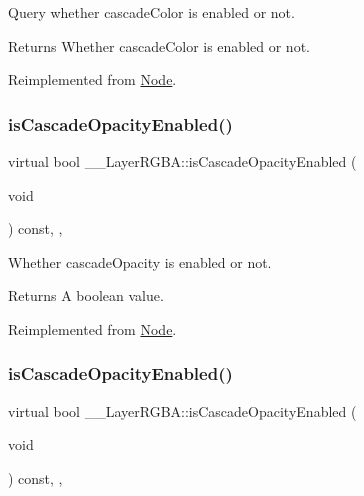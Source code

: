 Query whether cascade\+Color is enabled or not. \begin{DoxyReturn}{Returns}
Whether cascade\+Color is enabled or not. 
\end{DoxyReturn}


Reimplemented from \hyperlink{classNode_abf874f1b388e773ca80732b1134508be}{Node}.

\mbox{\label{class____LayerRGBA_a3dd348cf39ca267d7c0ebb5000dce45e}} 
\subsubsection{\texorpdfstring{is\+Cascade\+Opacity\+Enabled()}{isCascadeOpacityEnabled()}\hspace{0.1cm}{\footnotesize\ttfamily [1/2]}}
{\footnotesize\ttfamily virtual bool \+\_\+\+\_\+\+Layer\+R\+G\+B\+A\+::is\+Cascade\+Opacity\+Enabled (\begin{DoxyParamCaption}\item[{void}]{ }\end{DoxyParamCaption}) const\hspace{0.3cm}{\ttfamily [inline]}, {\ttfamily [override]}, {\ttfamily [virtual]}}

Whether cascade\+Opacity is enabled or not. \begin{DoxyReturn}{Returns}
A boolean value. 
\end{DoxyReturn}


Reimplemented from \hyperlink{classNode_a79f5da3b20b08356467db7ce95cf9f54}{Node}.

\mbox{\label{class____LayerRGBA_a3dd348cf39ca267d7c0ebb5000dce45e}} 
\subsubsection{\texorpdfstring{is\+Cascade\+Opacity\+Enabled()}{isCascadeOpacityEnabled()}\hspace{0.1cm}{\footnotesize\ttfamily [2/2]}}
{\footnotesize\ttfamily virtual bool \+\_\+\+\_\+\+Layer\+R\+G\+B\+A\+::is\+Cascade\+Opacity\+Enabled (\begin{DoxyParamCaption}\item[{void}]{ }\end{DoxyParamCaption}) const\hspace{0.3cm}{\ttfamily [inline]}, {\ttfamily [override]}, {\ttfamily [virtual]}}

